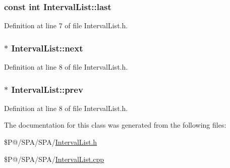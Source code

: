 \hypertarget{class_interval_list_aa93f98ec04c2960f0f573ad44437a92b}{
\subsubsection[{last}]{\setlength{\rightskip}{0pt plus 5cm}const int Interval\-List\-::last}}\label{class_interval_list_aa93f98ec04c2960f0f573ad44437a92b}


Definition at line 7 of file Interval\-List.\-h.

\hypertarget{class_interval_list_ae97a594b41b0e48efb55d1377fc84126}{
\subsubsection[{next}]{ $\ast$ Interval\-List\-::next}}\label{class_interval_list_ae97a594b41b0e48efb55d1377fc84126}


Definition at line 8 of file Interval\-List.\-h.

\hypertarget{class_interval_list_a65f0ce062c99c24b5890550f3c0fcbd5}{
\subsubsection[{prev}]{$\ast$ Interval\-List\-::prev}}\label{class_interval_list_a65f0ce062c99c24b5890550f3c0fcbd5}


Definition at line 8 of file Interval\-List.\-h.



The documentation for this class was generated from the following files\-:\begin{DoxyCompactItemize}
\item 
\$\-P@/\-S\-P\-A/\-S\-P\-A/\hyperlink{_interval_list_8h}{Interval\-List.\-h}\item 
\$\-P@/\-S\-P\-A/\-S\-P\-A/\hyperlink{_interval_list_8cpp}{Interval\-List.\-cpp}\end{DoxyCompactItemize}
